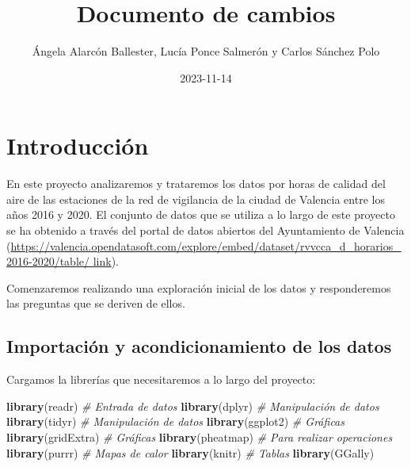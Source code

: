 \documentclass[
]{article}
\title{Documento de cambios}
\author{Ángela Alarcón Ballester, Lucía Ponce Salmerón y Carlos Sánchez
Polo}
\date{2023-11-14}
\newenvironment{Shaded}{\begin{snugshade}}{\end{snugshade}}
\newcommand{\CommentTok}[1]{\textcolor[rgb]{0.56,0.35,0.01}{\textit{#1}}}
\newcommand{\FunctionTok}[1]{\textcolor[rgb]{0.13,0.29,0.53}{\textbf{#1}}}
\newcommand{\NormalTok}[1]{#1}
\begin{document}
\maketitle

\hypertarget{introducciuxf3n}{%
\section{Introducción}\label{introducciuxf3n}}

En este proyecto analizaremos y trataremos los datos por horas de
calidad del aire de las estaciones de la red de vigilancia de la ciudad
de Valencia entre los años 2016 y 2020. El conjunto de datos que se
utiliza a lo largo de este proyecto se ha obtenido a través del portal
de datos abiertos del Ayuntamiento de Valencia
(\href{https://valencia.opendatasoft.com/explore/embed/dataset/rvvcca_d_horarios_2016-2020/table/}{https://valencia.opendatasoft.com/explore/embed/dataset/rvvcca\_d\_horarios\_2016-2020/table/
link}).

Comenzaremos realizando una exploración inicial de los datos y
responderemos las preguntas que se deriven de ellos.

\hypertarget{importaciuxf3n-y-acondicionamiento-de-los-datos}{%
\subsection{Importación y acondicionamiento de los
datos}\label{importaciuxf3n-y-acondicionamiento-de-los-datos}}

Cargamos la librerías que necesitaremos a lo largo del proyecto:

\begin{Shaded}
\begin{Highlighting}[]
\FunctionTok{library}\NormalTok{(readr) }\CommentTok{\# Entrada de datos}
\FunctionTok{library}\NormalTok{(dplyr) }\CommentTok{\# Manipulación de datos}
\FunctionTok{library}\NormalTok{(tidyr) }\CommentTok{\# Manipulación de datos}
\FunctionTok{library}\NormalTok{(ggplot2) }\CommentTok{\# Gráficas}
\FunctionTok{library}\NormalTok{(gridExtra) }\CommentTok{\# Gráficas}
\FunctionTok{library}\NormalTok{(pheatmap) }\CommentTok{\# Para realizar operaciones}
\FunctionTok{library}\NormalTok{(purrr) }\CommentTok{\# Mapas de calor}
\FunctionTok{library}\NormalTok{(knitr) }\CommentTok{\# Tablas}
\FunctionTok{library}\NormalTok{(GGally)}
\end{Highlighting}
\end{Shaded}
\end{document}
